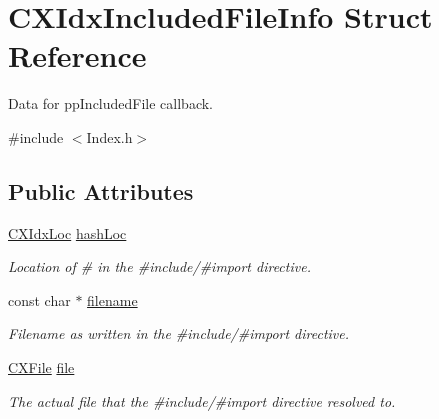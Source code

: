 \hypertarget{structCXIdxIncludedFileInfo}{}\section{C\+X\+Idx\+Included\+File\+Info Struct Reference}
\label{structCXIdxIncludedFileInfo}


Data for pp\+Included\+File callback.  




{\ttfamily \#include $<$Index.\+h$>$}

\subsection*{Public Attributes}
\begin{DoxyCompactItemize}
\item 
\mbox{\label{structCXIdxIncludedFileInfo_a2138c7f64cb8129d654749a089f50831}} 
\mbox{\hyperlink{structCXIdxLoc}{C\+X\+Idx\+Loc}} \mbox{\hyperlink{structCXIdxIncludedFileInfo_a2138c7f64cb8129d654749a089f50831}{hash\+Loc}}
\begin{DoxyCompactList}\small\item\em Location of \textquotesingle{}\#\textquotesingle{} in the \#include/\#import directive. \end{DoxyCompactList}\item 
\mbox{\label{structCXIdxIncludedFileInfo_ae97be6241f40b1c1bbc2d304678a409f}} 
const char $\ast$ \mbox{\hyperlink{structCXIdxIncludedFileInfo_ae97be6241f40b1c1bbc2d304678a409f}{filename}}
\begin{DoxyCompactList}\small\item\em Filename as written in the \#include/\#import directive. \end{DoxyCompactList}\item 
\mbox{\label{structCXIdxIncludedFileInfo_a99ce5417ea5d75d6f614351f8ba7d8bc}} 
\mbox{\hyperlink{group__CINDEX__FILES_gacfcea9c1239c916597e2e5b3e109215a}{C\+X\+File}} \mbox{\hyperlink{structCXIdxIncludedFileInfo_a99ce5417ea5d75d6f614351f8ba7d8bc}{file}}
\begin{DoxyCompactList}\small\item\em The actual file that the \#include/\#import directive resolved to. \end{DoxyCompactList}\item 

\end{DoxyCompactItemize}
